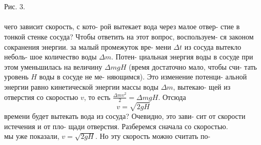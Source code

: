 \begin{minipage}[t]{0.44\textwidth}
        \\
        \\
        Рис. 3.\\
        \\
	\null{} чего зависит скорость, с кото-\linebreak
        рой вытекает вода через малое отвер-\linebreak
        стие в тонкой стенке сосуда? Чтобы\linebreak
        ответить на этот вопрос, воспользуем-\linebreak
        ся законом сокранения энергии.
        \null{} за малый промежуток вре-\linebreak
        мени $\Delta t$ из сосуда вытекло неболь-\linebreak
        шое количество воды $\Delta m$. Потен-\linebreak
        циальная энергия воды в сосуде при\linebreak
        этом уменьшилась на величину $\Delta mgH$\linebreak
        (время достаточно мало, чтобы счи-\linebreak
        тать уровень $H$ воды в сосуде не ме-\linebreak
        няющимся). Это изменение потенци-\linebreak
        альной энергии равно кинетической\linebreak
        энергии массы воды $\Delta m$, вытекаю-\linebreak
        щей из отверстия со скоростью $v$,\linebreak
        то есть $\frac{\Delta m{v}^2}{2} = \Delta mgH$. Отсюда\linebreak
        $$v = \sqrt{2gH}$$
        \null{} времени будет вытекать\linebreak
        вода из сосуда? Очевидно, это зави-\linebreak
        сит от скорости истечения и от пло-\linebreak
        щади отверстия. Разберемся сначала\linebreak
        со скоростью.\\
        \null{} мы уже показали, $v=\sqrt{2gH}$.\linebreak
        Но эту скорость можно считать по-\linebreak

\end{minipage}
